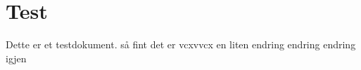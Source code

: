 \documentclass{article}
\begin{document}
\section{Test}
Dette er et testdokument. så fint det er vcxvvcx en liten endring endring endring igjen

\lipsum[1-2]
\end{document}
